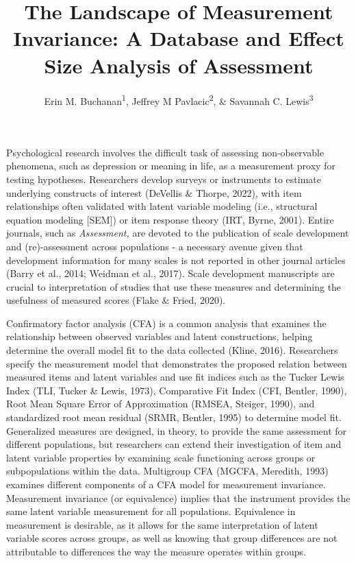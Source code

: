 \documentclass[
  english,
  man]{apa7}
\title{The Landscape of Measurement Invariance: A Database and Effect Size Analysis of Assessment}
\author{Erin M. Buchanan\textsuperscript{1}, Jeffrey M Pavlacic\textsuperscript{2}, \& Savannah C. Lewis\textsuperscript{3}}
\date{}
\affiliation{\vspace{0.5cm}\textsuperscript{1} Harrisburg University of Science and Technology\\\textsuperscript{2} Medical University of South Carolina\\\textsuperscript{3} University of Alabama}
\begin{document}
\maketitle

Psychological research involves the difficult task of assessing non-observable phenomena, such as depression or meaning in life, as a measurement proxy for testing hypotheses. Researchers develop surveys or instruments to estimate underlying constructs of interest (DeVellis \& Thorpe, 2022), with item relationships often validated with latent variable modeling (i.e., structural equation modeling {[}SEM{]}) or item response theory (IRT, Byrne, 2001). Entire journals, such as \emph{Assessment,} are devoted to the publication of scale development and (re)-assessment across populations - a necessary avenue given that development information for many scales is not reported in other journal articles (Barry et al., 2014; Weidman et al., 2017). Scale development manuscripts are crucial to interpretation of studies that use these measures and determining the usefulness of measured scores (Flake \& Fried, 2020).

Confirmatory factor analysis (CFA) is a common analysis that examines the relationship between observed variables and latent constructions, helping determine the overall model fit to the data collected (Kline, 2016). Researchers specify the measurement model that demonstrates the proposed relation between measured items and latent variables and use fit indices such as the Tucker Lewis Index (TLI, Tucker \& Lewis, 1973), Comparative Fit Index (CFI, Bentler, 1990), Root Mean Square Error of Approximation (RMSEA, Steiger, 1990), and standardized root mean residual (SRMR, Bentler, 1995) to determine model fit. Generalized measures are designed, in theory, to provide the same assessment for different populations, but researchers can extend their investigation of item and latent variable properties by examining scale functioning across groups or subpopulations within the data. Multigroup CFA (MGCFA, Meredith, 1993) examines different components of a CFA model for measurement invariance. Measurement invariance (or equivalence) implies that the instrument provides the same latent variable measurement for all populations. Equivalence in measurement is desirable, as it allows for the same interpretation of latent variable scores across groups, as well as knowing that group differences are not attributable to differences the way the measure operates within groups.
\end{document}
